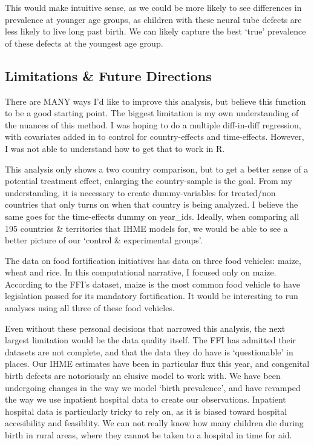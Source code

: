 \documentclass[]{article}
\begin{document}
This would make intuitive sense, as we could be more likely to see
differences in prevalence at younger age groups, as children with these
neural tube defects are less likely to live long past birth. We can
likely capture the best `true' prevalence of these defects at the
youngest age group.

\subsection{Limitations \& Future
Directions}\label{limitations-future-directions}

There are MANY ways I'd like to improve this analysis, but believe this
function to be a good starting point. The biggest limitation is my own
understanding of the nuances of this method. I was hoping to do a
multiple diff-in-diff regression, with covariates added in to control
for country-effects and time-effects. However, I was not able to
understand how to get that to work in R.

This analysis only shows a two country comparison, but to get a better
sense of a potential treatment effect, enlarging the country-sample is
the goal. From my understanding, it is necessary to create
dummy-variables for treated/non countries that only turns on when that
country is being analyzed. I believe the same goes for the time-effects
dummy on year\_ids. Ideally, when comparing all 195 countries \&
territories that IHME models for, we would be able to see a better
picture of our `control \& experimental groups'.

The data on food fortification initiatives has data on three food
vehicles: maize, wheat and rice. In this computational narrative, I
focused only on maize. According to the FFI's dataset, maize is the most
common food vehicle to have legislation passed for its mandatory
fortification. It would be interesting to run analyses using all three
of these food vehicles.

Even without these personal decisions that narrowed this analysis, the
next largest limitation would be the data quality itself. The FFI has
admitted their datasets are not complete, and that the data they do have
is `questionable' in places. Our IHME estimates have been in particular
flux this year, and congenital birth defects are notoriously an elusive
model to work with. We have been undergoing changes in the way we model
`birth prevalence', and have revamped the way we use inpatient hospital
data to create our observations. Inpatient hospital data is particularly
tricky to rely on, as it is biased toward hospital accesibility and
feasiblity. We can not really know how many children die during birth in
rural areas, where they cannot be taken to a hospital in time for aid.
\end{document}

